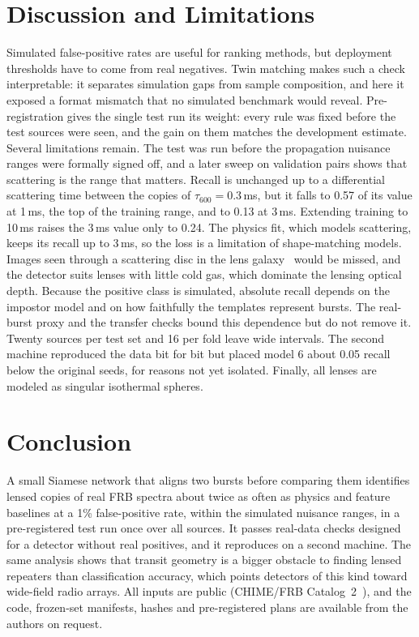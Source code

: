 \documentclass[conference]{IEEEtran}
\begin{document}
\section{Discussion and Limitations}
Simulated false-positive rates are useful for ranking methods, but deployment thresholds have to come from real negatives.
Twin matching makes such a check interpretable: it
separates simulation gaps from sample composition, and here it exposed a format mismatch that no simulated benchmark would
reveal. Pre-registration gives the single test run its weight: every rule was fixed before the test sources were seen, and the
gain on them matches the development estimate.
Several limitations remain. The test was run before the propagation nuisance ranges were formally signed off, and a
later sweep on validation pairs shows that scattering is the range that matters. Recall is unchanged up to a differential
scattering time between the copies of $\tau_{600}=0.3$\,ms, but it falls to 0.57 of its value at 1\,ms, the top of the
training range, and to 0.13 at 3\,ms. Extending training to 10\,ms raises the 3\,ms value only to 0.24. The physics fit,
which models scattering, keeps its recall up to 3\,ms, so the loss is a limitation of shape-matching models. Images seen
through a scattering disc in the lens galaxy~\cite{Wucknitz2021} would be missed, and the detector suits lenses with little
cold gas, which dominate the lensing optical depth. Because the positive class is simulated, absolute recall depends on the
impostor model and on how faithfully the templates represent bursts. The real-burst proxy and the transfer checks bound this
dependence but do not remove it. Twenty sources per test set and 16 per fold leave wide intervals. The second machine
reproduced the data bit for bit but placed model 6 about 0.05 recall below the original seeds, for reasons not yet isolated. Finally, all lenses are modeled as singular isothermal spheres.

\section{Conclusion}
A small Siamese network that aligns two bursts before comparing them identifies lensed copies of real FRB spectra about twice
as often as physics and feature baselines at a 1\% false-positive rate, within the simulated nuisance ranges, in a
pre-registered test run once over all sources. It passes real-data checks designed for a detector without real positives,
and it reproduces on a second machine. The same analysis shows that transit geometry is a bigger obstacle to finding lensed
repeaters than classification accuracy, which points detectors of this kind toward wide-field radio arrays. All inputs are
public (CHIME/FRB Catalog~2~\cite{CHIME2025cat2}), and the code, frozen-set manifests, hashes and pre-registered plans are
available from the authors on request.

\balance  %


\end{document}
